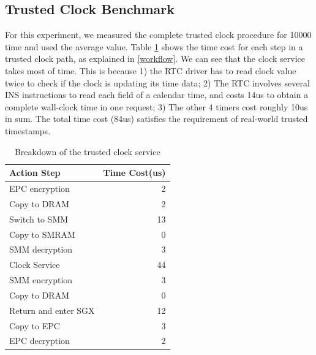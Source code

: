 \subsection{Trusted Clock Benchmark}\label{time_bench}
For this experiment, we measured the complete trusted clock procedure for 10000 time and used the average value. Table \ref{table:breaktime} shows the time cost for each step in a trusted clock path, as explained in \autoref{workflow}. We can see that the clock service takes most of time. This is because 1) the RTC driver has to read clock value twice to check if the clock is updating its time data; 2) The RTC involves several \textsf{INS} instructions to read each field of a calendar time, and costs 14us to obtain a complete wall-clock time in one request; 3) The other 4 timers cost roughly 10us in sum. The total  time cost (84us) satisfies the requirement of real-world trusted timestamps.
\begin{table}[t]
	\centering
	\caption{ Breakdown of the trusted clock service}
	\small
	\label{table:breaktime}
	\begin{tabular}{lr}
		\toprule
		\textbf{Action Step} & \textbf{Time Cost(us)} \\
		\midrule
		EPC encryption & 2\\
		Copy to DRAM & 2\\
		Switch to SMM & 13\\
		Copy to SMRAM & 0\\
		SMM decryption & 3\\
		Clock Service & 44\\
		SMM encryption & 3\\
		Copy to DRAM & 0\\
		Return and enter SGX & 12\\
		Copy to EPC & 3\\
		EPC decryption & 2\\
		\bottomrule
	\end{tabular}
\end{table}
